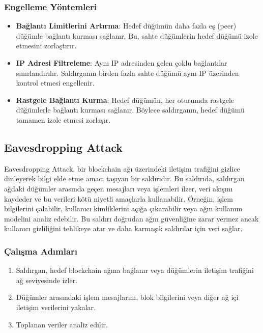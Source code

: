 \subsubsection{Engelleme Yöntemleri}

\begin{itemize}
    \item \textbf{Bağlantı Limitlerini Artırma}: Hedef düğümün daha fazla eş (peer) düğümle bağlantı kurması sağlanır. Bu, sahte düğümlerin hedef düğümü izole etmesini zorlaştırır.
    \item \textbf{IP Adresi Filtreleme}: Aynı IP adresinden gelen çoklu bağlantılar sınırlandırılır. Saldırganın birden fazla sahte düğümü aynı IP üzerinden kontrol etmesi engellenir.
    \item \textbf{Rastgele Bağlantı Kurma}: Hedef düğümün, her oturumda rastgele düğümlerle bağlantı kurması sağlanır. Böylece saldırganın, hedef düğümü tamamen izole etmesi zorlaşır.
\end{itemize}

\newpage

\subsection{Eavesdropping Attack}

Eavesdropping Attack, bir blockchain ağı üzerindeki iletişim trafiğini gizlice dinleyerek bilgi elde etme amacı taşıyan bir saldırıdır. Bu saldırıda, saldırgan ağdaki düğümler arasında geçen mesajları veya işlemleri ilzer, veri akışını kaydeder ve bu verileri kötü niyetli amaçlarla kullanabilir. Örneğin, işlem bilgilerini çalabilir, kullanıcı kimliklerini açığa çıkarabilir veya ağın kullanım modelini analiz edebilir. Bu saldırı doğrudan ağın güvenliğine zarar vermez ancak kullanıcı gizliliğini tehlikeye atar ve daha karmaşık saldırılar için veri sağlar.

\subsubsection{Çalışma Adımları}

\begin{enumerate}
    \item Saldırgan, hedef blockchain ağına bağlanır veya düğümlerin iletişim trafiğini ağ seviyesinde izler.
    \item Düğümler arasındaki işlem mesajlarını, blok bilgilerini veya diğer ağ içi iletişim verilerini yakalar.
    \item Toplanan veriler analiz edilir. 
\end{enumerate}

